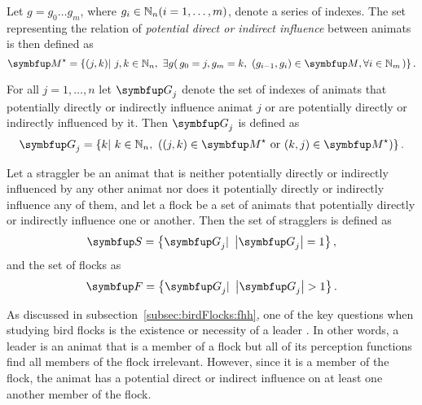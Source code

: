 Let $g=g_0\ldots g_m$, where $g_i \in \mathbb{N}_n (i=1,\ldots,m)$, denote a series of indexes. The set representing the relation of \emph{potential direct or indirect influence} between animats is then defined as
%
\begin{equation}
	\set{M}^\star= \left\{ (j,k)|\ j, k \in \N_n,\ \exists g \right(g_0=j, g_m=k,\ (g_{i-1}, g_i) \in \set{M}, \forall i \in \N_m\left) \right\}. \label{eq:metric:M*}
\end{equation}

For all $j=1,\ldots,n$ let $\set{G}_j$ denote the set of indexes of animats that potentially directly or indirectly influence animat $j$ or are potentially directly or indirectly influenced by it. Then $\set{G}_j$ is defined as
%
\begin{equation}
	\set{G}_j=\left\{k|\ k \in \N_n,\ \left((j,k) \in \set{M}^\star\ \mathrm{or}\ (k,j) \in \set{M}^\star\right) \right\}. \label{eq:metric:Gi}
\end{equation}

Let a straggler be an animat that is neither potentially directly or indirectly influenced by any other animat nor does it potentially directly or indirectly influence any of them, and let a flock be a set of animats that potentially directly or indirectly influence one or another. Then the set of stragglers is defined as 
%
\begin{equation}
	\set{S}=\left\{ \set{G}_j|\ \left|\set{G}_j\right|=1 \right\}, \label{eq:stragglers}
\end{equation}
%
and the set of flocks as
%
\begin{equation}
	\set{F}=\left\{ \set{G}_j|\ \left|\set{G}_j\right|>1 \right\}. \label{eq:metric:flocks}
\end{equation}

As discussed in subsection~\ref{subsec:birdFlocks:fhh}, one of the key questions when studying bird flocks is the existence or necessity of a leader \cite{heppner:1997}.  In other words, a leader is an animat that is a member of a flock but all of its perception functions find all members of the flock irrelevant. However, since it is a member of the flock, the animat has a potential direct or indirect influence on at least one another member of the flock. 

